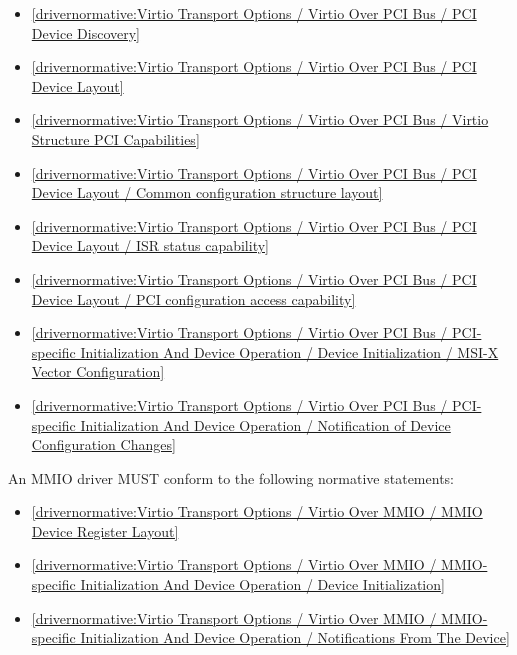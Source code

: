\begin{itemize}
\item \ref{drivernormative:Virtio Transport Options / Virtio Over PCI Bus / PCI Device Discovery}
\item \ref{drivernormative:Virtio Transport Options / Virtio Over PCI Bus / PCI Device Layout}
\item \ref{drivernormative:Virtio Transport Options / Virtio Over PCI Bus / Virtio Structure PCI Capabilities}
\item \ref{drivernormative:Virtio Transport Options / Virtio Over PCI Bus / PCI Device Layout / Common configuration structure layout}
\item \ref{drivernormative:Virtio Transport Options / Virtio Over PCI Bus / PCI Device Layout / ISR status capability}
\item \ref{drivernormative:Virtio Transport Options / Virtio Over PCI Bus / PCI Device Layout / PCI configuration access capability}
\item \ref{drivernormative:Virtio Transport Options / Virtio Over PCI Bus / PCI-specific Initialization And Device Operation / Device Initialization / MSI-X Vector Configuration}
\item \ref{drivernormative:Virtio Transport Options / Virtio Over PCI Bus / PCI-specific Initialization And Device Operation / Notification of Device Configuration Changes}
\end{itemize}

\label{sec:Conformance / Driver Conformance / MMIO Driver Conformance}

An MMIO driver MUST conform to the following normative statements:

\begin{itemize}
\item \ref{drivernormative:Virtio Transport Options / Virtio Over MMIO / MMIO Device Register Layout}
\item \ref{drivernormative:Virtio Transport Options / Virtio Over MMIO / MMIO-specific Initialization And Device Operation / Device Initialization}
\item \ref{drivernormative:Virtio Transport Options / Virtio Over MMIO / MMIO-specific Initialization And Device Operation / Notifications From The Device}
\end{itemize}

